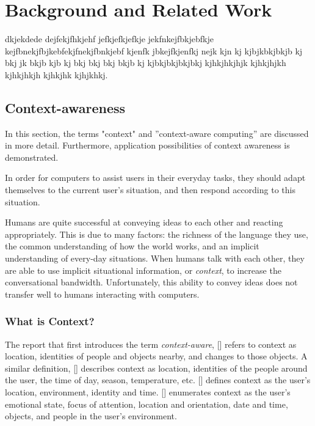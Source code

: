 \chapter{Background and Related Work\label{cha:chapter2}}
dkjekdede dejfekjfhkjehf jefkjefkjefkje jekfnkejfbkjebfkje kejfbnekjfbjkebfekjfnekjfbnkjebf kjenfk jbkejfkjenfkj nejk kjn kj kjbjkbkjbkjb kj bkj jk bkjb kjb kj bkj bkj bkj bkjb kj  kjbkjbkjbkjbkj
kjhkjhkjhjk kjhkjhjkh kjhkjhkjh kjhkjhk kjhjkhkj.

\section{Context-awareness\label{sec:back_con_aw}}
In this section, the terms "context" and ''context-aware computing'' are discussed in more detail. Furthermore, application possibilities of context awareness is demonstrated.

In order for computers to assist users in their everyday tasks, they should adapt themselves to the current user's situation, and then respond according to this situation. 

Humans are quite successful at conveying ideas to each other and reacting appropriately. This is due to many factors: the richness of the language they use, the common understanding of how the world works, and an implicit understanding of every-day situations. When humans talk with each other, they are able to use implicit situational information, or \emph{context}, to increase the conversational bandwidth. Unfortunately, this ability to convey ideas does not transfer well to humans interacting with computers.\citeauthor{Dey2000b}

\subsection{What is Context?}

The report that first introduces the term \emph{context-aware}, [\citeauthor{ieee313011}] refers to context as location, identities of people and objects nearby, and changes to those objects. A similar definition, [\citeauthor{ieee626984}] describes context as location, identities of the people around the user, the time of day, season, temperature, etc. [\citeauthor{Ryan97}] defines context as the user's location, environment, identity and time. [\citeauthor{Dey98}] enumerates context as the user's emotional state, focus of attention, location and orientation, date and time, objects, and people in the user's environment. %

